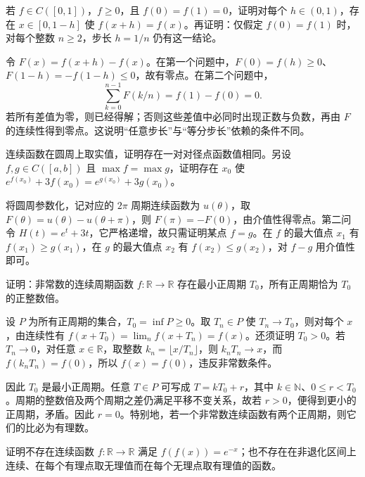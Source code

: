 \begin{example}
若 $f\in C([0,1])$，$f\ge0$，且 $f(0)=f(1)=0$，证明对每个 $h\in(0,1)$，存在 $x\in[0,1-h]$ 使 $f(x+h)=f(x)$。再证明：仅假定 $f(0)=f(1)$ 时，对每个整数 $n\ge2$，步长 $h=1/n$ 仍有这一结论。
\end{example}

\begin{solve}
令 $F(x)=f(x+h)-f(x)$。在第一个问题中，$F(0)=f(h)\ge0$、$F(1-h)=-f(1-h)\le0$，故有零点。在第二个问题中，
\[
\sum_{k=0}^{n-1}F(k/n)=f(1)-f(0)=0.
\]
若所有差值为零，则已经得解；否则这些差值中必同时出现正数与负数，再由 $F$ 的连续性得到零点。这说明“任意步长”与“等分步长”依赖的条件不同。
\end{solve}

\begin{example}
连续函数在圆周上取实值，证明存在一对对径点函数值相同。另设 $f,g\in C([a,b])$ 且 $\max f=\max g$，证明存在 $x_0$ 使 $e^{f(x_0)}+3f(x_0)=e^{g(x_0)}+3g(x_0)$。
\end{example}

\begin{solve}
将圆周参数化，记对应的 $2\pi$ 周期连续函数为 $u(\theta)$，取 $F(\theta)=u(\theta)-u(\theta+\pi)$，则 $F(\pi)=-F(0)$，由介值性得零点。第二问令 $H(t)=e^t+3t$，它严格递增，故只需证明某点 $f=g$。在 $f$ 的最大值点 $x_1$ 有 $f(x_1)\ge g(x_1)$，在 $g$ 的最大值点 $x_2$ 有 $f(x_2)\le g(x_2)$，对 $f-g$ 用介值性即可。
\end{solve}

\begin{example}
\label{ex:pei-minimal-period}
证明：非常数的连续周期函数 $f:\mathbb R\to\mathbb R$ 存在最小正周期 $T_0$，所有正周期恰为 $T_0$ 的正整数倍。
\end{example}

\begin{solve}
设 $P$ 为所有正周期的集合，$T_0=\inf P\ge0$。取 $T_n\in P$ 使 $T_n\to T_0$，则对每个 $x$，由连续性有 $f(x+T_0)=\lim_n f(x+T_n)=f(x)$。还须证明 $T_0>0$。若 $T_n\to0$，对任意 $x\in\mathbb R$，取整数 $k_n=\lfloor x/T_n\rfloor$，则 $k_nT_n\to x$，而 $f(k_nT_n)=f(0)$，所以 $f(x)=f(0)$，违反非常数条件。

因此 $T_0$ 是最小正周期。任意 $T\in P$ 可写成 $T=kT_0+r$，其中 $k\in\mathbb N$、$0\le r<T_0$。周期的整数倍及两个周期之差仍满足平移不变关系，故若 $r>0$，便得到更小的正周期，矛盾。因此 $r=0$。特别地，若一个非常数连续函数有两个正周期，则它们的比必为有理数。
\end{solve}

\begin{example}
证明不存在连续函数 $f:\mathbb R\to\mathbb R$ 满足 $f(f(x))=e^{-x}$；也不存在在非退化区间上连续、在每个有理点取无理值而在每个无理点取有理值的函数。
\end{example}

